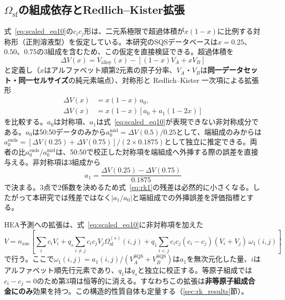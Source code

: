 \documentclass[5p,10pt]{elsarticle}
\begin{document}
\subsection{$\Omega_\text{sf}$の組成依存とRedlich--Kister拡張}
\label{sec:rk_method}

式~\eqref{eq:scaled_eq10}の$c_i c_j$形は、二元系極限で超過体積が$x(1-x)$に比例する対称形（正則溶液型）を仮定している。本研究のSQSデータベースは$x = 0.25$、$0.50$、$0.75$の3組成を含むため、この仮定を直接検証できる。超過体積を
\begin{equation}
  \Delta V(x) = V_\text{alloy}(x)
  - \left[(1-x) V_A + x V_B\right]
  \label{eq:dv_x}
\end{equation}
と定義し（$x$はアルファベット順第2元素の原子分率、$V_A$・$V_B$は\textbf{同一データセット・同一セルサイズ}の純元素端点）、対称形と Redlich--Kister 一次項による拡張形
\begin{align}
  \Delta V(x) &= x(1-x)\, a_0,
  \label{eq:rk0} \\
  \Delta V(x) &= x(1-x)
  \left[a_0 + a_1 (1-2x)\right]
  \label{eq:rk1}
\end{align}
を比較する。$a_0$は対称項、$a_1$は式~\eqref{eq:scaled_eq10}が表現できない非対称成分である。$a_0$は50:50データのみから$a_0^\text{mid} = \Delta V(0.5)/0.25$として、端組成のみからは$a_0^\text{ends} = [\Delta V(0.25)+\Delta V(0.75)]/(2 \times 0.1875)$として独立に推定できる。両者の比$a_0^\text{ends}/a_0^\text{mid}$は、50:50で校正した対称項を端組成へ外挿する際の誤差を直接与える。非対称項は3組成から
\begin{equation}
  a_1 = \frac{\Delta V(0.25) - \Delta V(0.75)}{0.1875}
  \label{eq:a1}
\end{equation}
で決まる。3点で2係数を決めるため式~\eqref{eq:rk1}の残差は必然的に小さくなる。したがって本研究では残差ではなく$|a_1/a_0|$と端組成での外挿誤差を評価指標とする。

HEA予測への拡張は、式~\eqref{eq:scaled_eq10}に非対称項を加えた
\begin{equation}
  V = n_\text{auc} \!\left[
    \sum_i c_i V_i
    + q_s \!\!\sum_{i \ne j}\!\! c_i c_j V_j \Omega_\text{sf}^{(s)}(i,j)
    + q_1 \!\!\sum_{i<j}\!\! c_i c_j (c_i - c_j)
      (V_i + V_j)\, \omega_1(i,j)
  \right]
  \label{eq:rk_hea}
\end{equation}
で行う。ここで$\omega_1(i,j) = a_1(i,j)/(V_A^\text{SQS} + V_B^\text{SQS})$は$a_1$を無次元化した量、$i$はアルファベット順先行元素であり、$q_1$は$q_s$と独立に校正する。等原子組成では$c_i - c_j = 0$のため第3項は恒等的に消える。すなわちこの拡張は\textbf{非等原子組成合金にのみ}効果を持つ。この構造的性質自体も定量する（\ref{sec:rk_results}節）。
\end{document}
